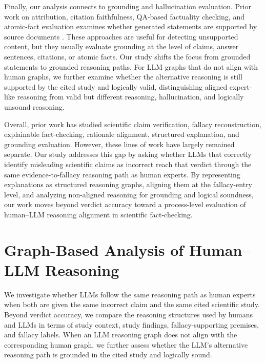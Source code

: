 \documentclass[11pt]{article}
\begin{document}
Finally, our analysis connects to grounding and hallucination evaluation. Prior work on attribution, citation faithfulness, QA-based factuality checking, and atomic-fact evaluation examines whether generated statements are supported by source documents \citep{gao2023enabling,min2023factscore,fabbri2022qafacteval,tang2024minicheck,li2024attributionbench}. These approaches are useful for detecting unsupported content, but they usually evaluate grounding at the level of claims, answer sentences, citations, or atomic facts. Our study shifts the focus from grounded statements to grounded reasoning paths. For LLM graphs that do not align with human graphs, we further examine whether the alternative reasoning is still supported by the cited study and logically valid, distinguishing aligned expert-like reasoning from valid but different reasoning, hallucination, and logically unsound reasoning.

Overall, prior work has studied scientific claim verification, fallacy reconstruction, explainable fact-checking, rationale alignment, structured explanation, and grounding evaluation. However, these lines of work have largely remained separate. Our study addresses this gap by asking whether LLMs that correctly identify misleading scientific claims as incorrect reach that verdict through the same evidence-to-fallacy reasoning path as human experts. By representing explanations as structured reasoning graphs, aligning them at the fallacy-entry level, and analyzing non-aligned reasoning for grounding and logical soundness, our work moves beyond verdict accuracy toward a process-level evaluation of human--LLM reasoning alignment in scientific fact-checking.

\section{Graph-Based Analysis of Human--LLM Reasoning}
\label{sec:reasoning-graph-method}

We investigate whether LLMs follow the same reasoning path as human experts when both are given the same incorrect claim and the same cited scientific study. 
Beyond verdict accuracy, we compare the reasoning structures used by humans and LLMs in terms of study context, study findings, fallacy-supporting premises, and fallacy labels. 
When an LLM reasoning graph does not align with the corresponding human graph, we further assess whether the LLM's alternative reasoning path is grounded in the cited study and logically sound.
\end{document}
